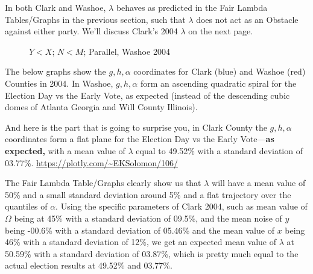 \documentclass[preprint,13pt]{elsarticle}
\begin{document}
In both Clark and Washoe, $\lambda$ behaves as predicted in the Fair Lambda Tables/Graphs in the previous section, such that $\lambda$ does not act as an Obstacle against either party. We'll discuss Clark's 2004 $\lambda$ on the next page.
\begin{figure}[bp!]
\begin{center}
\caption{$Y<X$; $N<M$; Parallel, Washoe 2004}
\noindent{}
\end{center}
\end{figure}
\newpage
The below graphs show the $g,h,\alpha$ coordinates for Clark (blue) and Washoe (red) Counties in 2004. In Washoe, $g,h,\alpha$ form an ascending quadratic spiral for the Election Day vs the Early Vote, as expected (instead of the descending cubic domes of Atlanta Georgia and Will County Illinois).

And here is the part that is going to surprise you, in Clark County the $g,h,\alpha$ coordinates form a flat plane for the Election Day vs the Early Vote---\textbf{as expected,} with a mean value of $\lambda$ equal to 49.52\% with a standard deviation of 03.77\%. \url{https://plotly.com/~EKSolomon/106/}

The Fair Lambda Table/Graphs clearly show us that $\lambda$ will have a mean value of 50\% and a small standard deviation around 5\% and a flat trajectory over the quantiles of $\alpha$. Using the specific parameters of Clark 2004, such as mean value of $\Omega$ being at 45\% with a standard deviation of 09.5\%, and the mean noise of $y$ being -00.6\% with a standard deviation of 05.46\% and the mean value of $x$ being 46\% with a standard deviation of 12\%, we get an expected mean value of $\lambda$ at 50.59\% with a standard deviation of 03.87\%, which is pretty much equal to the actual election results at 49.52\% and 03.77\%.
\end{document}
